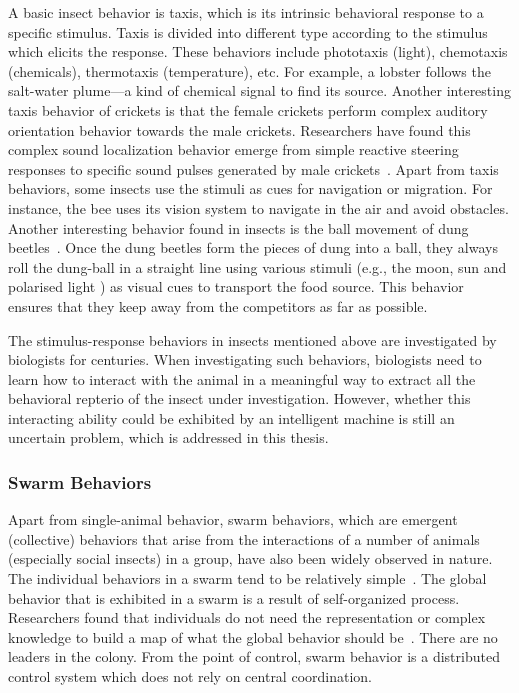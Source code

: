 A basic insect behavior is taxis, which is its intrinsic behavioral response to a specific stimulus. Taxis is divided into different type according to the stimulus which elicits the response. These behaviors include phototaxis (light), chemotaxis (chemicals), thermotaxis (temperature), etc. For example, a lobster follows the salt-water plume---a kind of chemical signal to find its source. Another interesting taxis behavior of crickets is that the female crickets perform complex auditory orientation behavior towards the male crickets. Researchers have found this complex sound localization behavior emerge from simple reactive steering responses to specific sound pulses generated by male crickets~\cite{Hedwig2004}. Apart from taxis behaviors, some insects use the stimuli as cues for navigation or migration. For instance, the bee uses its vision system to navigate in the air and avoid obstacles. Another interesting behavior found in insects is the ball movement of dung beetles~\cite{Emily_2012}. Once the dung beetles form the pieces of dung into a ball, they always roll the dung-ball in a straight line using various stimuli (e.g., the moon, sun and polarised light \cite{Byrne_2003, Matthews_1962}) as visual cues to transport the food source. This behavior ensures that they keep away from the competitors as far as possible. 
 
The stimulus-response behaviors in insects mentioned above are investigated by biologists for centuries. When investigating such behaviors, biologists need to learn how to interact with the animal in a meaningful way to extract all the behavioral repterio of the insect under investigation. However, whether this interacting ability could be exhibited by an intelligent machine is still an uncertain problem, which is addressed in this thesis. 

\subsubsection{Swarm Behaviors}

Apart from single-animal behavior, swarm behaviors, which are emergent (collective) behaviors that arise from the interactions of a number of animals (especially social insects) in a group, have also been widely observed in nature. The individual behaviors in a swarm tend to be relatively simple~\cite{Camazine2001}. The global behavior that is exhibited in a swarm is a result of self-organized process. Researchers found that individuals do not need the representation or complex knowledge to build a map of what the global behavior should be~\cite{Garnier:SI:2007}. There are no leaders in the colony. From the point of control, swarm behavior is a distributed control system which does not rely on central coordination.

